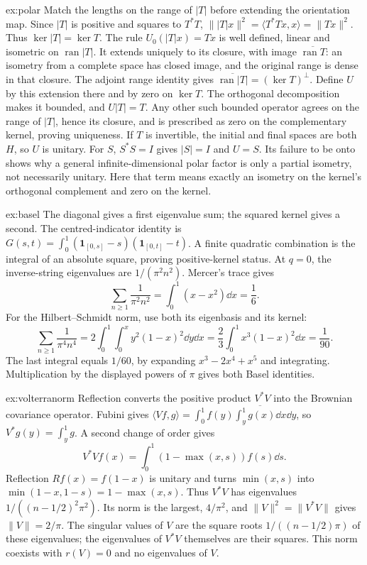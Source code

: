 \begin{solution}{ex:polar}
\idea Match the lengths on the range of $|T|$ before extending the orientation map.
\writeup Since $|T|$ is positive and squares to $T^*T$,
$\||T|x\|^2=\langle T^*Tx,x\rangle=\|Tx\|^2$.
Thus $\ker|T|=\ker T$. The rule $U_0(|T|x)=Tx$ is well defined, linear and isometric on $\operatorname{ran}|T|$. It extends uniquely to its closure, with image $\overline{\operatorname{ran}T}$: an isometry from a complete space has closed image, and the original range is dense in that closure. The adjoint range identity gives $\overline{\operatorname{ran}|T|}=(\ker T)^\perp$. Define $U$ by this extension there and by zero on $\ker T$. The orthogonal decomposition makes it bounded, and $U|T|=T$. Any other such bounded operator agrees on the range of $|T|$, hence its closure, and is prescribed as zero on the complementary kernel, proving uniqueness.
If $T$ is invertible, the initial and final spaces are both $H$, so $U$ is unitary. For $S$, $S^*S=I$ gives $|S|=I$ and $U=S$. Its failure to be onto shows why a general infinite-dimensional polar factor is only a partial isometry, not necessarily unitary. Here that term means exactly an isometry on the kernel's orthogonal complement and zero on the kernel.
\end{solution}

\begin{solution}{ex:basel}
\idea The diagonal gives a first eigenvalue sum; the squared kernel gives a second.
\writeup The centred-indicator identity is
$G(s,t)=\int_0^1(\mathbf1_{[0,s]}-s)(\mathbf1_{[0,t]}-t)$.
A finite quadratic combination is the integral of an absolute square, proving positive-kernel status. At $q=0$, the inverse-string eigenvalues are $1/(\pi^2n^2)$. Mercer's trace gives
\[
\sum_{n\ge1}\frac1{\pi^2n^2}=\int_0^1(x-x^2)\dd x=\frac16.
\]
For the Hilbert--Schmidt norm, use both its eigenbasis and its kernel:
\[
\sum_{n\ge1}\frac1{\pi^4n^4}
=2\int_0^1\int_0^xy^2(1-x)^2\dd y\dd x
=\frac23\int_0^1x^3(1-x)^2\dd x=\frac1{90}.
\]
The last integral equals $1/60$, by expanding $x^3-2x^4+x^5$ and integrating. Multiplication by the displayed powers of $\pi$ gives both Basel identities.
\end{solution}

\begin{solution}{ex:volterranorm}
\idea Reflection converts the positive product $V^*V$ into the Brownian covariance operator.
\writeup Fubini gives
$\langle Vf,g\rangle=\int_0^1f(y)\overline{\int_y^1g(x)\dd x}\dd y$,
so $V^*g(y)=\int_y^1g$. A second change of order gives
\[
V^*Vf(x)=\int_0^1(1-\max(x,s))f(s)\dd s.
\]
Reflection $Rf(x)=f(1-x)$ is unitary and turns $\min(x,s)$ into $\min(1-x,1-s)=1-\max(x,s)$. Thus $V^*V$ has eigenvalues $1/((n-1/2)^2\pi^2)$. Its norm is the largest, $4/\pi^2$, and $\|V\|^2=\|V^*V\|$ gives $\|V\|=2/\pi$. The singular values of $V$ are the square roots $1/((n-1/2)\pi)$ of these eigenvalues; the eigenvalues of $V^*V$ themselves are their squares. This norm coexists with $r(V)=0$ and no eigenvalues of $V$.
\end{solution}

